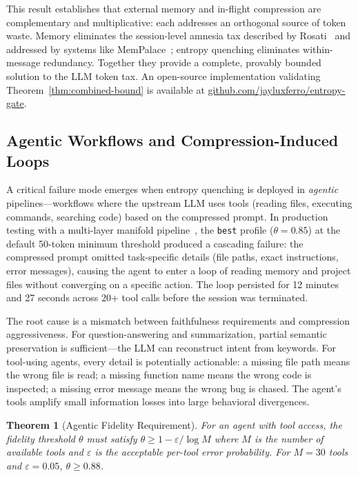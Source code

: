 \documentclass[11pt]{article}
\newtheorem{theorem}{Theorem}[section]
\theoremstyle{remark}
\begin{document}
This result establishes that external memory and in-flight compression are
complementary and multiplicative: each addresses an orthogonal source of token
waste. Memory eliminates the session-level amnesia tax described by
Rosati~\cite{rosati2026} and addressed by systems like
MemPalace~\cite{mempalace2026}; entropy quenching eliminates within-message
redundancy. Together they provide a complete, provably bounded solution to
the LLM token tax. An open-source implementation validating Theorem~\ref{thm:combined-bound}
is available at \url{github.com/jayluxferro/entropy-gate}.

\subsection{Agentic Workflows and Compression-Induced Loops}
\label{sec:agentic-loops}

A critical failure mode emerges when entropy quenching is deployed in
\emph{agentic} pipelines---workflows where the upstream LLM uses tools
(reading files, executing commands, searching code) based on the
compressed prompt. In production testing with a multi-layer manifold
pipeline~\cite{ollama}, the \texttt{best} profile ($\theta = 0.85$) at
the default 50-token minimum threshold produced a cascading failure:
the compressed prompt omitted task-specific details (file paths, exact
instructions, error messages), causing the agent to enter a loop of
reading memory and project files without converging on a specific action.
The loop persisted for 12 minutes and 27 seconds across 20+ tool calls
before the session was terminated.

The root cause is a mismatch between faithfulness requirements and
compression aggressiveness. For question-answering and summarization,
partial semantic preservation is sufficient---the LLM can reconstruct
intent from keywords. For tool-using agents, every detail is potentially
actionable: a missing file path means the wrong file is read; a missing
function name means the wrong code is inspected; a missing error message
means the wrong bug is chased. The agent's tools amplify small information
losses into large behavioral divergences.

\begin{theorem}[Agentic Fidelity Requirement]
\label{thm:agentic-fidelity}
For an agent with tool access, the fidelity threshold $\theta$ must satisfy
$\theta \geq 1 - \varepsilon / \log M$ where $M$ is the number of available
tools and $\varepsilon$ is the acceptable per-tool error probability.
For $M = 30$ tools and $\varepsilon = 0.05$, $\theta \geq 0.88$.
\end{theorem}
\end{document}
